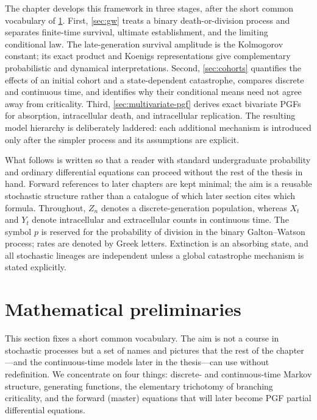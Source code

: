The chapter develops this framework in three stages, after the short common vocabulary of \cref{sec:preliminaries}.  First, \cref{sec:gw} treats a binary death-or-division process and separates finite-time survival, ultimate establishment, and the limiting conditional law.  The late-generation survival amplitude is the Kolmogorov constant; its exact product and Koenigs representations give complementary probabilistic and dynamical interpretations.  Second, \cref{sec:cohorts} quantifies the effects of an initial cohort and a state-dependent catastrophe, compares discrete and continuous time, and identifies why their conditional means need not agree away from criticality.  Third, \cref{sec:multivariate-pgf} derives exact bivariate PGFs for absorption, intracellular death, and intracellular replication.  The resulting model hierarchy is deliberately laddered: each additional mechanism is introduced only after the simpler process and its assumptions are explicit.

What follows is written so that a reader with standard undergraduate probability and ordinary differential equations can proceed without the rest of the thesis in hand.  Forward references to later chapters are kept minimal; the aim is a reusable stochastic structure rather than a catalogue of which later section cites which formula.  Throughout, $Z_n$ denotes a discrete-generation population, whereas $X_t$ and $Y_t$ denote intracellular and extracellular counts in continuous time.  The symbol $p$ is reserved for the probability of division in the binary Galton--Watson process; rates are denoted by Greek letters.  Extinction is an absorbing state, and all stochastic lineages are independent unless a global catastrophe mechanism is stated explicitly.


\section{Mathematical preliminaries}
\label{sec:preliminaries}

This section fixes a short common vocabulary.  The aim is not a course in stochastic processes but a set of names and pictures that the rest of the chapter---and the continuous-time models later in the thesis---can use without redefinition.  We concentrate on four things: discrete- and continuous-time Markov structure, generating functions, the elementary trichotomy of branching criticality, and the forward (master) equations that will later become PGF partial differential equations.

